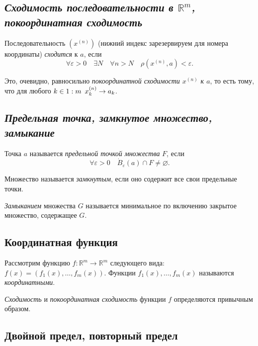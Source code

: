 \subsection{\itshape Сходимость последовательности в \(\mathbb{R}^m\), покоординатная сходимость}

\begin{definition}
	Последовательность  \((x^{(n)})\) (нижний индекс зарезервируем для номера координаты) \textit{сходится} к \(a\), если \[
	\forall \varepsilon > 0 \quad \exists N \quad \forall n > N \quad \rho(x^{(n)}, a) < \varepsilon.
	\]
	
	Это, очевидно, равносильно \textit{покоординатной сходимости \(x^{(n)}\) к \(a\)}, то есть тому, что для любого \(k \in 1 : m \enskip x_k^{(n)} \to a_k\).
\end{definition}

\subsection{\itshape Предельная точка, замкнутое множество, замыкание}

\begin{definition}
	Точка  \(a\) называется \textit{предельной точкой множества} \(F\), если \[
	\forall \varepsilon > 0 \quad \dot B_\varepsilon (a) \cap F \neq \varnothing.
	\]
	
	Множество называется \textit{замкнутым}, если оно содержит все свои предельные точки.
	
	\textit{Замыканием} множества \(G\) называется минимальное по включению закрытое множество, содержащее \(G\).
\end{definition}

\subsection{Координатная функция}

\begin{definition}
	Рассмотрим функцию \(f \colon \mathbb{R}^m \to \mathbb{R}^m\) следующего вида: \(f(x) = (f_1 (x), \ldots, f_m (x))\). Функции \(f_1 (x), \ldots, f_m (x)\) называются \textit{координатными}.
\end{definition}

\begin{remark}
	\textit{Сходимость} и \textit{покоординатная сходимость} функции \(f\) определяются привычным образом.
\end{remark}

\subsection{Двойной предел, повторный предел}

